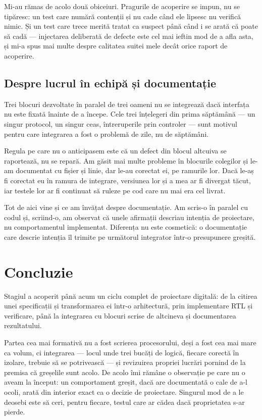 \documentclass[11pt,openany]{report}
\begin{document}
Mi-au rămas de acolo două obiceiuri. Pragurile de acoperire se impun, nu se
tipăresc: un test care numără contenții și nu cade când ele lipsesc nu verifică
nimic. Și un test care trece merită tratat ca suspect până când i se arată că
poate să cadă --- injectarea deliberată de defecte este cel mai ieftin mod de a
afla asta, și mi-a spus mai multe despre calitatea suitei mele decât orice raport
de acoperire.

\subsection{Despre lucrul în echipă și documentație}

Trei blocuri dezvoltate în paralel de trei oameni nu se integrează dacă interfața
nu este fixată înainte de a începe. Cele trei înțelegeri din prima săptămână ---
un singur protocol, un singur ceas, întreruperile prin controler --- sunt motivul
pentru care integrarea a fost o problemă de zile, nu de săptămâni.

Regula pe care nu o anticipasem este că un defect din blocul altcuiva se
raportează, nu se repară. Am găsit mai multe probleme în blocurile colegilor și
le-am documentat cu fișier și linie, dar le-au corectat ei, pe ramurile lor. Dacă
le-aș fi corectat eu în ramura de integrare, versiunea lor și a mea ar fi divergat
tăcut, iar testele lor ar fi continuat să ruleze pe cod care nu mai era cel
livrat.

Tot de aici vine și ce am învățat despre documentație. Am scris-o în paralel cu
codul și, scriind-o, am observat că unele afirmații descriau intenția de
proiectare, nu comportamentul implementat. Diferența nu este cosmetică: o
documentație care descrie intenția îl trimite pe următorul integrator într-o
presupunere greșită.

\section{Concluzie}

Stagiul a acoperit până acum un ciclu complet de proiectare digitală: de la
citirea unei specificații și transformarea ei într-o arhitectură, prin
implementare RTL și verificare, până la integrarea cu blocuri scrise de altcineva
și documentarea rezultatului.

Partea cea mai formativă nu a fost scrierea procesorului, deși a fost cea mai
mare ca volum, ci integrarea --- locul unde trei bucăți de logică, fiecare
corectă în izolare, trebuie să se potrivească --- și revizuirea propriei lucrări
pornind de la premisa că greșelile sunt acolo. De acolo îmi rămâne o observație
pe care nu o aveam la început: un comportament greșit, dacă are documentată o
cale de a-l ocoli, arată din interior exact ca o decizie de proiectare. Singurul
mod de a le deosebi este să ceri, pentru fiecare, testul care ar cădea dacă
proprietatea s-ar pierde.
\end{document}
